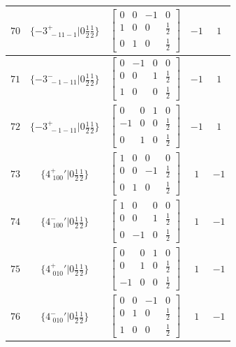 \documentclass[fleqn,8pt]{jsarticle}
\begin{document}
\begin{longtable}{ccccc}
$ 70 $ & $ \{-3^{+}_{\,\,-11-1}|0 \frac{1}{2} \frac{1}{2}\} $ & $ \begin{bmatrix} 0 & 0 & -1 & 0 \\ 1 & 0 & 0 & \frac{1}{2} \\ 0 & 1 & 0 & \frac{1}{2} \end{bmatrix} $ & $ -1 $ & $ 1 $ \\ \hline
$ 71 $ & $ \{-3^{-}_{\,\,-1-11}|0 \frac{1}{2} \frac{1}{2}\} $ & $ \begin{bmatrix} 0 & -1 & 0 & 0 \\ 0 & 0 & 1 & \frac{1}{2} \\ 1 & 0 & 0 & \frac{1}{2} \end{bmatrix} $ & $ -1 $ & $ 1 $ \\ \hline
$ 72 $ & $ \{-3^{+}_{\,\,-1-11}|0 \frac{1}{2} \frac{1}{2}\} $ & $ \begin{bmatrix} 0 & 0 & 1 & 0 \\ -1 & 0 & 0 & \frac{1}{2} \\ 0 & 1 & 0 & \frac{1}{2} \end{bmatrix} $ & $ -1 $ & $ 1 $ \\ \hline
$ 73 $ & $ \{4^{+}_{\,\,100}{}'|0 \frac{1}{2} \frac{1}{2}\} $ & $ \begin{bmatrix} 1 & 0 & 0 & 0 \\ 0 & 0 & -1 & \frac{1}{2} \\ 0 & 1 & 0 & \frac{1}{2} \end{bmatrix} $ & $ 1 $ & $ -1 $ \\ \hline
$ 74 $ & $ \{4^{-}_{\,\,100}{}'|0 \frac{1}{2} \frac{1}{2}\} $ & $ \begin{bmatrix} 1 & 0 & 0 & 0 \\ 0 & 0 & 1 & \frac{1}{2} \\ 0 & -1 & 0 & \frac{1}{2} \end{bmatrix} $ & $ 1 $ & $ -1 $ \\ \hline
$ 75 $ & $ \{4^{+}_{\,\,010}{}'|0 \frac{1}{2} \frac{1}{2}\} $ & $ \begin{bmatrix} 0 & 0 & 1 & 0 \\ 0 & 1 & 0 & \frac{1}{2} \\ -1 & 0 & 0 & \frac{1}{2} \end{bmatrix} $ & $ 1 $ & $ -1 $ \\ \hline
$ 76 $ & $ \{4^{-}_{\,\,010}{}'|0 \frac{1}{2} \frac{1}{2}\} $ & $ \begin{bmatrix} 0 & 0 & -1 & 0 \\ 0 & 1 & 0 & \frac{1}{2} \\ 1 & 0 & 0 & \frac{1}{2} \end{bmatrix} $ & $ 1 $ & $ -1 $ \\ \hline

\end{longtable}
\end{document}
